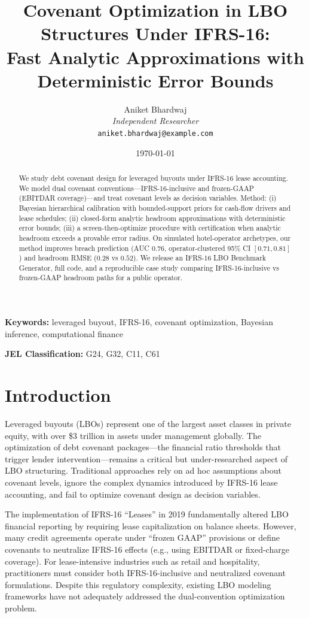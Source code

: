 \documentclass[11pt,a4paper]{article}
\title{Covenant Optimization in LBO Structures Under IFRS-16: \\
Fast Analytic Approximations with Deterministic Error Bounds}
\author{
Aniket Bhardwaj\\
\textit{Independent Researcher}\\
\texttt{aniket.bhardwaj@example.com}
}
\date{\today}
\theoremstyle{plain}
\theoremstyle{definition}
\begin{document}
\maketitle

\begin{abstract}
We study debt covenant design for leveraged buyouts under IFRS-16 lease accounting. We model dual covenant conventions—IFRS-16-inclusive and frozen-GAAP (EBITDAR coverage)—and treat covenant levels as decision variables. Method: (i) Bayesian hierarchical calibration with bounded-support priors for cash-flow drivers and lease schedules; (ii) closed-form analytic headroom approximations with deterministic error bounds; (iii) a screen-then-optimize procedure with certification when analytic headroom exceeds a provable error radius. On simulated hotel-operator archetypes, our method improves breach prediction (AUC $0.76$, operator-clustered 95\% CI $[0.71,0.81]$) and headroom RMSE ($0.28$ vs $0.52$). We release an IFRS-16 LBO Benchmark Generator, full code, and a reproducible case study comparing IFRS-16-inclusive vs frozen-GAAP headroom paths for a public operator.
\end{abstract}

\textbf{Keywords:} leveraged buyout, IFRS-16, covenant optimization, Bayesian inference, computational finance

\textbf{JEL Classification:} G24, G32, C11, C61

\section{Introduction}

Leveraged buyouts (LBOs) represent one of the largest asset classes in private equity, with over \$3 trillion in assets under management globally. The optimization of debt covenant packages---the financial ratio thresholds that trigger lender intervention---remains a critical but under-researched aspect of LBO structuring. Traditional approaches rely on ad hoc assumptions about covenant levels, ignore the complex dynamics introduced by IFRS-16 lease accounting, and fail to optimize covenant design as decision variables.

The implementation of IFRS-16 ``Leases'' in 2019 fundamentally altered LBO financial reporting by requiring lease capitalization on balance sheets. However, many credit agreements operate under ``frozen GAAP'' provisions or define covenants to neutralize IFRS-16 effects (e.g., using EBITDAR or fixed-charge coverage). For lease-intensive industries such as retail and hospitality, practitioners must consider both IFRS-16-inclusive and neutralized covenant formulations. Despite this regulatory complexity, existing LBO modeling frameworks have not adequately addressed the dual-convention optimization problem.
\end{document}
